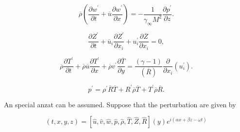 \begin{equation} 
\overline{\rho}
\left(
\frac{\partial w^{\prime}}{\partial t}
+
\overline{u}
\frac{\partial w^{\prime}}{\partial x}
\right)
=
-
\frac{1}{\gamma_{\infty} M^{2}}
\frac{\partial p^{\prime} }{\partial z} 
.
\end{equation} 

\begin{equation} 
\frac{\partial Z^{\prime}}{\partial t}
+
\overline{u}_i 
\frac{\partial  Z^{\prime}}{\partial x_i}
+
u_i^{\prime} 
\frac{\partial \overline{Z}}{\partial x_i}
=
0
,
\end{equation} 

\begin{equation}
\overline{\rho}
\frac{\partial T^{\prime} }{\partial  t}
+
\overline{\rho}
\overline{u}
\frac{\partial T^{\prime}}{\partial x}
+
\overline{\rho}
v^{\prime}
\frac{\partial \overline{T} }{\partial y} 
= 
\frac{(\gamma-1)}{(\overline{R})}
\frac{\partial}{\partial x_i} 
(u^\prime_i) 
.
\end{equation} 

\begin{equation*}
   p^{\prime}
   = 
   \rho^{\prime}
   \overline{R}
   \overline{T}
   +
   R^{\prime}
   \overline{\rho}
   \overline{T}
   +
   T^{\prime}
   \overline{\rho}
   \overline{R}
   .
\end{equation*}

An special anzat can be assumed. Suppose that 
the perturbation are given  by 

\begin{equation}
   [u^\prime, v^\prime, w^\prime, p^\prime, \rho^\prime, T^\prime,  Z^\prime, R^\prime] 
   (t,x,y,z)
   =
   [\hat{u}, \hat{v}, \hat{w},\hat{p},\hat{\rho},\hat{T},\hat{Z},\hat{R}]
   (y)
   e^{i(\alpha x+\beta z  -\omega t)}
\end{equation}

%

